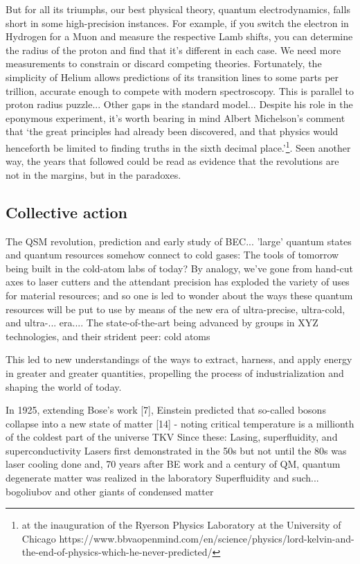 	But for all its triumphs, our best physical theory, quantum electrodynamics, falls short in some high-precision instances.
	For example, if you switch the electron in Hydrogen for a Muon and measure the respective Lamb shifts, you can determine the radius of the proton and find that it's different in each case.
	We need more measurements to constrain or discard competing theories.
	Fortunately, the simplicity of Helium allows predictions of its transition lines to some parts per trillion, accurate enough to compete with modern spectroscopy.
	This is parallel to proton radius puzzle... Other gaps in the standard model...
	Despite his role in the eponymous experiment, it's worth bearing in mind Albert Michelson's comment that `the great principles had already been discovered, and that physics would henceforth be limited to finding truths in the sixth decimal place.'\footnote{ at the inauguration of the Ryerson Physics Laboratory at the University of Chicago https://www.bbvaopenmind.com/en/science/physics/lord-kelvin-and-the-end-of-physics-which-he-never-predicted/}.
	Seen another way, the years that followed could be read as evidence that the revolutions are not in the margins, but in the paradoxes.

\subsection*{Collective action}
	The QSM revolution, prediction and early study of BEC... 
		'large' quantum states and quantum resources
		somehow connect to cold gases: The tools of tomorrow being built in the cold-atom labs of today? By analogy, we've gone from hand-cut axes to laser cutters and the attendant precision has exploded the variety of uses for material resources; and so one is led to wonder about the ways these quantum resources will be put to use by means of the new era of ultra-precise, ultra-cold, and ultra-... era.... The state-of-the-art being advanced by groups in XYZ technologies, and their strident peer: cold atoms

		 This led to new understandings of the ways to extract, harness, and apply energy in greater and greater quantities, propelling the process of industrialization and shaping the world of today.

	In 1925, extending Bose's work [7], Einstein predicted that so-called bosons collapse into a new state of matter [14] - noting critical temperature is a millionth of the coldest part of the universe TKV
	Since these: Lasing, superfluidity, and superconductivity 
	Lasers first demonstrated in the 50s but not until the 80s was laser cooling done and, 70 years after BE work and a century of QM, quantum degenerate matter was realized in the laboratory
	Superfluidity and such... bogoliubov and other giants of condensed matter

